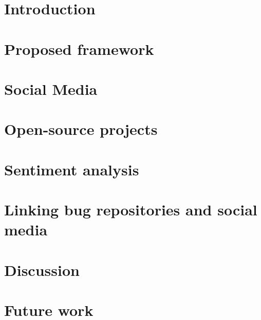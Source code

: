 \documentclass[a4paper,11pt,pdftex,halfparskip,cleardoubleempty]{scrbook}
\begin{document}

\cleardoublepage
\tableofcontents 
\cleardoublepage
{}
\pagestyle{plain} 

\chapter{Introduction}
\label{chp:introduction}

 
 
\chapter{Proposed framework}
\label{chap:proposedFramework}




\chapter{Social Media}
\label{chap:socialMedia}



\chapter{Open-source projects}
\label{chap:ossProjects}



\chapter{Sentiment analysis}
\label{chap:sentimentAnalysis}


\chapter{Linking bug repositories and social media}
\label{chap:pairingBugs}


\chapter{Discussion}
\label{chap:discussion}


\chapter{Future work}
\label{chap:futureWork}


\label{sec:introduction}


\newpage
\nocite{*}


\end{document}
